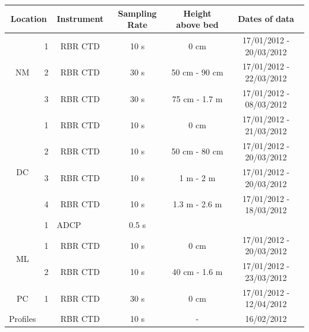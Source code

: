 \documentclass[tesis.tex]{subfiles}
\begin{document}
\begin{table}[h!]
    \begin{tabular}{|cc|c|c|c|c|}
    \hline
    \multicolumn{2}{|c|}{Location}                & Instrument & Sampling Rate & Height above bed & Dates of data           \\ \hline
    \multicolumn{1}{|c|}{\multirow{3}{*}{NM}} & 1 & RBR CTD    & 10 s          & 0 cm             & 17/01/2012 - 20/03/2012 \\ \cline{2-6} 
    \multicolumn{1}{|c|}{}                    & 2 & RBR CTD    & 30 s          & 50 cm - 90 cm    & 17/01/2012 - 22/03/2012 \\ \cline{2-6} 
    \multicolumn{1}{|c|}{}                    & 3 & RBR CTD    & 30 s          & 75 cm -  1.7 m   & 17/01/2012 - 08/03/2012 \\ \hline
    \multicolumn{1}{|c|}{\multirow{5}{*}{DC}} & 1 & RBR CTD    & 10 s          & 0 cm             & 17/01/2012 - 21/03/2012 \\ \cline{2-6} 
    \multicolumn{1}{|c|}{}                    & 2 & RBR CTD    & 10 s          & 50 cm - 80 cm    & 17/01/2012 - 20/03/2012 \\ \cline{2-6} 
    \multicolumn{1}{|c|}{}                    & 3 & RBR CTD    & 10 s          & 1 m - 2 m        & 17/01/2012 - 20/03/2012 \\ \cline{2-6} 
    \multicolumn{1}{|c|}{}                    & 4 & RBR CTD    & 10 s          & 1.3 m - 2.6 m    & 17/01/2012 - 18/03/2012 \\ \cline{2-6} 
    \multicolumn{1}{|c|}{} & \multicolumn{1}{l|}{1} & \multicolumn{1}{l|}{ADCP} & 0.5 s & \multicolumn{1}{l|}{} & \multicolumn{1}{l|}{} \\ \hline
    \multicolumn{1}{|c|}{\multirow{2}{*}{ML}} & 1 & RBR CTD    & 10 s          & 0 cm             & 17/01/2012 - 20/03/2012 \\ \cline{2-6} 
    \multicolumn{1}{|c|}{}                    & 2 & RBR CTD    & 10 s          & 40 cm - 1.6 m    & 17/01/2012 - 23/03/2012 \\ \hline
    \multicolumn{1}{|c|}{PC}                  & 1 & RBR CTD    & 30 s          & 0 cm             & 17/01/2012 - 12/04/2012 \\ \hline
    \multicolumn{1}{|c|}{Profiles}            &   & RBR CTD    & 10 s          & -                & 16/02/2012              \\ \hline
    \end{tabular}
    \end{table}
\end{document}
